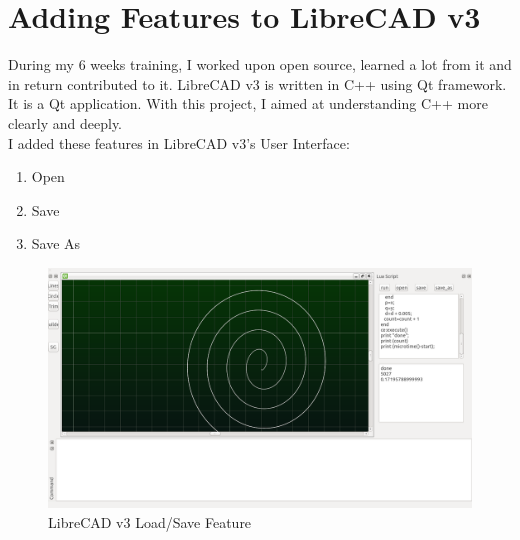 \section{Adding Features to LibreCAD v3}
During my 6 weeks training, I worked upon open source, learned a lot from it and in return contributed to it. LibreCAD v3 is written in C++ using Qt framework. It is a Qt application. With this project, I aimed at understanding C++ more clearly and deeply.\\
I added these features in LibreCAD v3's User Interface:
\begin{enumerate}
\item Open
\item Save 
\item Save As
\end{enumerate}
\begin{figure}[!ht]
\centering
\includegraphics[scale=0.4]{images/ui.png}
\caption{LibreCAD v3 Load/Save Feature}
\end{figure}

